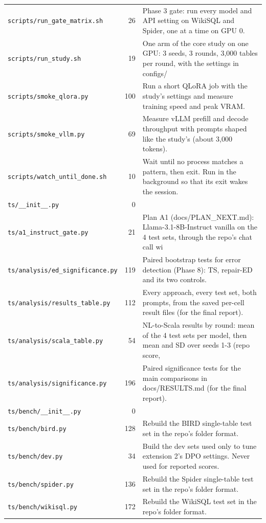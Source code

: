 {\begin{longtable}{@{}p{4.6cm}rp{9.2cm}@{}}
\texttt{scripts/run\_gate\_matrix.sh} & 26 & Phase 3 gate: run every model and API setting on WikiSQL and Spider, one at a time on GPU 0.\\
\texttt{scripts/run\_study.sh} & 19 & One arm of the core study on one GPU: 3 seeds, 3 rounds, 3,000 tables per round, with the settings in configs/\\
\texttt{scripts/smoke\_qlora.py} & 100 & Run a short QLoRA job with the study's settings and measure training speed and peak VRAM.\\
\texttt{scripts/smoke\_vllm.py} & 69 & Measure vLLM prefill and decode throughput with prompts shaped like the study's (about 3,000 tokens).\\
\texttt{scripts/watch\_until\_done.sh} & 10 & Wait until no process matches a pattern, then exit. Run in the background so that its exit wakes the session.\\
\texttt{ts/\_\_init\_\_.py} & 0 & \\
\texttt{ts/a1\_instruct\_gate.py} & 21 & Plan A1 (docs/PLAN\_NEXT.md): Llama-3.1-8B-Instruct vanilla on the 4 test sets, through the repo's chat call wi\\
\texttt{ts/analysis/ed\_significance.py} & 119 & Paired bootstrap tests for error detection (Phase 8): TS, repair-ED and its two controls.\\
\texttt{ts/analysis/results\_table.py} & 112 & Every approach, every test set, both prompts, from the saved per-cell result files (for the final report).\\
\texttt{ts/analysis/scala\_table.py} & 54 & NL-to-Scala results by round: mean of the 4 test sets per model, then mean and SD over seeds 1-3 (repo score,\\
\texttt{ts/analysis/significance.py} & 196 & Paired significance tests for the main comparisons in docs/RESULTS.md (for the final report).\\
\texttt{ts/bench/\_\_init\_\_.py} & 0 & \\
\texttt{ts/bench/bird.py} & 128 & Rebuild the BIRD single-table test set in the repo's folder format.\\
\texttt{ts/bench/dev.py} & 34 & Build the dev sets used only to tune extension 2's DPO settings. Never used for reported scores.\\
\texttt{ts/bench/spider.py} & 136 & Rebuild the Spider single-table test set in the repo's folder format.\\
\texttt{ts/bench/wikisql.py} & 172 & Rebuild the WikiSQL test set in the repo's folder format.\\

\end{longtable}}
